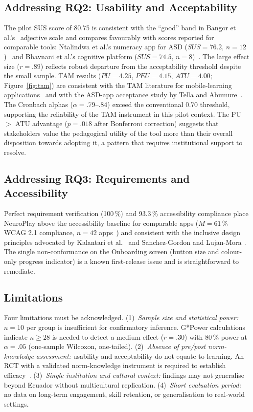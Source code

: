 \documentclass[preprint,12pt]{elsarticle}
\begin{document}
        \subsection{Addressing RQ2: Usability and Acceptability}
            The pilot SUS score of 80.75 is consistent with the ``good'' band in Bangor et al.'s~\cite{Bangor2008} adjective scale and compares favourably with scores reported for comparable tools: Ntalindwa et al.'s numeracy app for ASD ($\mathit{SUS} = 76.2$, $n = 12$)~\cite{Ntalindwa2021} and Bhavnani et al.'s cognitive platform ($\mathit{SUS} = 74.5$, $n = 8$)~\cite{Bhavnani2019}. The large effect size ($r = .89$) reflects robust departure from the acceptability threshold despite the small sample. TAM results ($\mathit{PU} = 4.25$, $\mathit{PEU} = 4.15$, $\mathit{ATU} = 4.00$; Figure~\ref{fig:tam}) are consistent with the TAM literature for mobile-learning applications~\cite{AlEmran2018} and with the ASD-app acceptance study by Tella and Abumure~\cite{Tella2025}. The Cronbach alphas ($\alpha = .79$--$.84$) exceed the conventional 0.70 threshold, supporting the reliability of the TAM instrument in this pilot context. The PU $>$ ATU advantage ($p = .018$ after Bonferroni correction) suggests that stakeholders value the pedagogical utility of the tool more than their overall disposition towards adopting it, a pattern that requires institutional support to resolve.
        
        \subsection{Addressing RQ3: Requirements and Accessibility}
            Perfect requirement verification (100\,\%) and 93.3\,\% accessibility compliance place NeuroPlay above the accessibility baseline for comparable apps ($M = 61\,\%$ WCAG 2.1 compliance, $n = 42$ apps~\cite{Chinchay2024}) and consistent with the inclusive design principles advocated by Kalantari et al.~\cite{Kalantari2025} and Sanchez-Gordon and Lujan-Mora~\cite{Sanchez2022}. The single non-conformance on the Onboarding screen (button size and colour-only progress indicator) is a known first-release issue and is straightforward to remediate.
        
        \subsection{Limitations}
            Four limitations must be acknowledged. (1)~\emph{Sample size and statistical power:} $n = 10$ per group is insufficient for confirmatory inference. G*Power calculations indicate $n \geq 28$ is needed to detect a medium effect ($r = .30$) with 80\,\% power at $\alpha = .05$ (one-sample Wilcoxon, one-tailed). (2)~\emph{Absence of pre/post norm-knowledge assessment:} usability and acceptability do not equate to learning. An RCT with a validated norm-knowledge instrument is required to establish efficacy~\cite{Dai2025,Sailer2020}. (3)~\emph{Single institution and cultural context:} findings may not generalise beyond Ecuador without multicultural replication. (4)~\emph{Short evaluation period:} no data on long-term engagement, skill retention, or generalisation to real-world settings.
        
\end{document}
